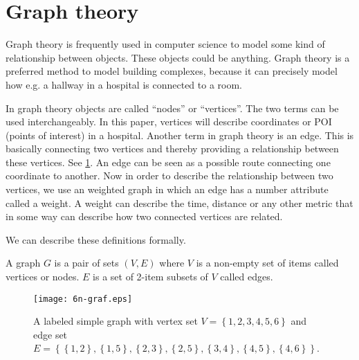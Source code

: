 \section{Graph theory}

Graph theory is frequently used in computer science to model some kind of relationship between objects. These objects could be anything. Graph theory is a preferred method to model building complexes, because it can precisely model how e.g. a hallway in a hospital is connected to a room.

In graph theory objects are called \enquote{nodes} or \enquote{vertices}. The two terms can be used interchangeably. In this paper, vertices will describe coordinates or POI (points of interest) in a hospital. Another term in graph theory is an edge. This is basically connecting two vertices and thereby providing a relationship between these vertices. See \cref{fig:labeled_graph}. An edge can be seen as a possible route connecting one coordinate to another. Now in order to describe the relationship between two vertices, we use an weighted graph in which an edge has a number attribute called a weight. A weight can describe the time, distance or any other metric that in some way can describe how two connected vertices are related.\cite{wiki_graph_glos,MIT2012}

We can describe these definitions formally.\cite{MIT2012}
\begin{mydef}
	A graph $G$ is a pair of sets $(V,E)$ where $V$ is a non-empty set of items called vertices or nodes. $E$ is a set of 2-item subsets of $V$ called edges.
\end{mydef}

\begin{figure}[ht!]
    \centering
    \texttt{[image: 6n-graf.eps]}
    \caption{A labeled simple graph with vertex set $V = \left\{ {1, 2, 3, 4, 5, 6} \right\} $ and edge set $E = \left\{ \left\{ {1,2}\right\}, \left\{ {1,5}\right\}, \left\{ {2,3}\right\}, \left\{ {2,5}\right\}, \left\{ {3,4}\right\}, \left\{ {4,5} \right\} , \left\{ {4,6} \right\} \right\}$. \cite{wiki_graph_glos}}
    \label{fig:labeled_graph}
  \end{figure}

